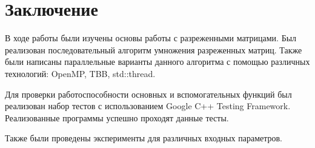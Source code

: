 \documentclass{report}
\begin{document}
\section*{Заключение}
В ходе работы были изучены основы работы с разреженными матрицами. Был реализован последовательный алгоритм умножения разреженных матриц. Также были написаны параллельные варианты данного алгоритма с помощью различных технологий: OpenMP, TBB, std::thread.
\par Для проверки работоспособности основных и вспомогательных функций был реализован набор тестов с использованием Google C++ Testing Framework. Реализованные программы успешно проходят данные тесты.
\par Также были проведены эксперименты для различных входных параметров.
\newpage
\end{document}
